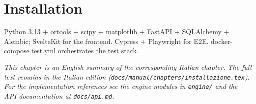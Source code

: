 \chapter{Installation}
\label{ch:installazione_en}

Python 3.13 + ortools + scipy + matplotlib + FastAPI + SQLAlchemy + Alembic; SvelteKit for the frontend. Cypress + Playwright for E2E. docker-compose.test.yml orchestrates the test stack.

\medskip
\noindent
\textit{This chapter is an English summary of the corresponding Italian chapter. The full text remains in the Italian edition (\texttt{docs/manual/chapters/installazione.tex}). For the implementation references see the engine modules in \texttt{engine/} and the API documentation at \texttt{docs/api.md}.}
